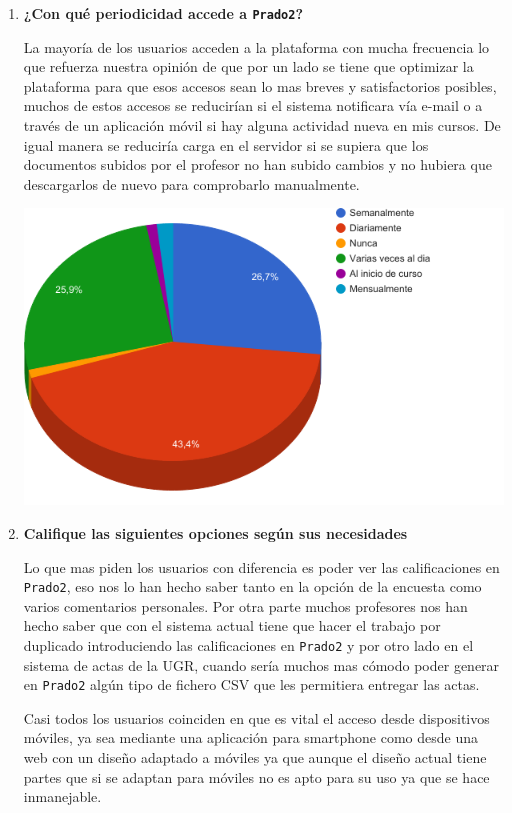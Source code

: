 \begin{enumerate}
  \item \textbf{¿Con qué periodicidad accede a \texttt{Prado2}?}

  La mayoría de los usuarios acceden a la plataforma con mucha frecuencia lo que refuerza nuestra opinión de que por un lado se tiene que optimizar la plataforma para que esos accesos sean lo mas breves y satisfactorios posibles, muchos de estos accesos se reducirían si el sistema notificara vía e-mail o a través de un aplicación móvil si hay alguna actividad nueva en mis cursos. De igual manera se reduciría carga en el servidor si se supiera que los documentos subidos por el profesor no han subido cambios y no hubiera que descargarlos de nuevo para comprobarlo manualmente.



  \includegraphics[width=1.0\textwidth]{../charts/03_periodicidad}


  \item \textbf{Califique las siguientes opciones según sus necesidades}

Lo que mas piden los usuarios con diferencia es poder ver las calificaciones en \texttt{Prado2}, eso nos lo han hecho saber tanto en la opción de la encuesta como varios comentarios personales. Por otra parte muchos profesores nos han hecho saber que con el sistema actual tiene que hacer el trabajo por duplicado introduciendo las calificaciones en \texttt{Prado2} y por otro lado en el sistema de actas de la UGR, cuando sería muchos mas cómodo poder generar en \texttt{Prado2} algún tipo de fichero CSV que les permitiera entregar las actas.

\bigskip
Casi todos los usuarios coinciden en que es vital el acceso desde dispositivos móviles, ya sea mediante una aplicación para smartphone como desde una web con un diseño adaptado a móviles ya que aunque el diseño actual tiene partes que si se adaptan para móviles no es apto para su uso ya que se hace inmanejable.


\end{enumerate}
